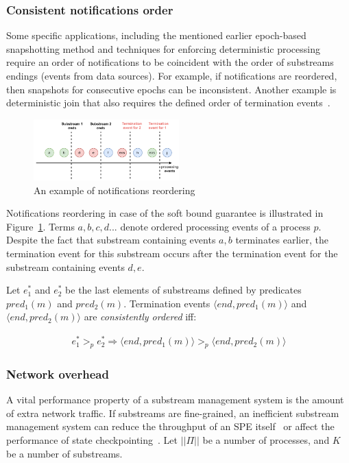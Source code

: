\subsubsection{Consistent notifications order}
Some specific applications, including the mentioned earlier epoch-based snapshotting method and techniques for enforcing deterministic processing~\cite{we2018adbis} require an order of notifications to be coincident with the order of substreams endings (events from data sources). For example, if notifications are reordered, then snapshots for consecutive epochs can be inconsistent. Another example is deterministic join that also requires the defined order of termination events~\cite{gulisano2016scalejoin}.

\begin{figure}[htbp]
  \centering
  \includegraphics[width=0.50\textwidth]{pics/notifications-reordering.pdf}
  \caption{An example of notifications reordering}
  \label{notifications_reordering}
\end{figure}

Notifications reordering in case of the soft bound guarantee is illustrated in Figure~\ref{notifications_reordering}. Terms $a,b,c,d...$ denote ordered processing events of a process $p$. Despite the fact that substream containing events $a,b$ terminates earlier, the termination event for this substream occurs after the termination event for the substream containing events $d,e$. 

Let $e^{*}_1$ and $e^{*}_2$ be the last elements of substreams defined by predicates $pred_1(m)$ and $pred_2(m)$. Termination events $\langle end, pred_1(m)\rangle$ and $\langle end, pred_2(m)\rangle$ are {\em consistently ordered} iff:

\begin{align*}
e^{*}_1 >_p e^{*}_2 \Longrightarrow \langle end, pred_1(m)\rangle >_p \langle end, pred_2(m)\rangle
\end{align*}

\subsubsection{Network overhead}

A vital performance property of a substream management system is the amount of extra network traffic. If substreams are fine-grained, an inefficient substream management system can reduce the throughput of an SPE itself~\cite{Li:2008:OPN:1453856.1453890} or affect the performance of state checkpointing~\cite{zhang2021research}. Let $||\Pi||$ be a number of processes, and $K$ be a number of substreams. 

